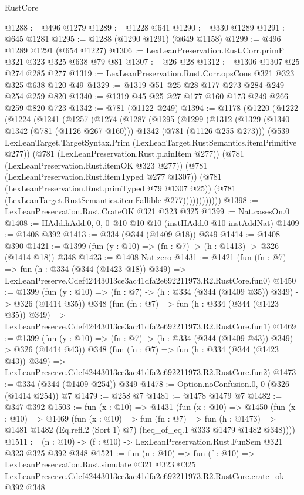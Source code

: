 \begin{lexlean}{RustCore}
\begin{coremodule}
@1288 := @496 @1279
@1289 := @1228 @641
@1290 := @330 @1289
@1291 := @645 @1281
@1295 := @1288 (@1290 @1291) (@649 @1158)
@1299 := @496 @1289 @1291 (@654 @1227)
@1306 := LexLeanPreservation.Rust.Corr.primF @321 @323 @325 @638 @79 @81
@1307 := @26 @28
@1312 := @1306 @1307 @25 @274 @285 @277
@1319 := LexLeanPreservation.Rust.Corr.opsCons @321 @323 @325 @638 @120 @49
@1329 := @1319 @51 @25 @28 @177 @273 @284 @249 @254 @259 @820
@1340 := @1319 @45 @25 @27 @177 @160 @173 @249 @266 @259 @820 @723
@1342 := @781 (@1122 @249)
@1394 := @1178
    (@1220
      (@1222
        (@1224
          (@1241
            (@1257
              (@1274
                (@1287
                  (@1295
                    (@1299
                      (@1312
                        (@1329
                          (@1340 @1342 (@781 (@1126 @267 @160)))
                          @1342
                          (@781 (@1126 @255 @273)))
                        (@539
                          LexLeanTarget.TargetSyntax.Prim
                          (LexLeanTarget.RustSemantics.itemPrimitive @277))
                        (@781 (LexLeanPreservation.Rust.plainItem @277))
                        (@781 (LexLeanPreservation.Rust.itemOK @323 @277))
                        (@781 (LexLeanPreservation.Rust.itemTyped @277 @1307))
                        (@781 (LexLeanPreservation.Rust.primTyped @79 @1307 @25))
                        (@781 (LexLeanTarget.RustSemantics.itemFallible @277))))))))))))
@1398 := LexLeanPreservation.Rust.CrateOK @321 @323 @325
@1399 := Nat.casesOn.{0}
@1408 := HAdd.hAdd.{0, 0, 0} @10 @10 @10 (instHAdd.{0} @10 instAddNat)
@1409 := @1408 @392
@1413 := @334 (@344 (@1409 @18)) @349
@1414 := @1408 @390
@1421 := @1399 (fun (y : @10) => (fn : @7) -> (h : @1413) -> @326 (@1414 @18)) @348
@1423 := @1408 Nat.zero
@1431 := @1421
    (fun (fn : @7) =>
    fun (h : @334 (@344 (@1423 @18)) @349) =>
    LexLeanPreserve.Cdef42443013ce3ac41dfa2e692211973.R2.RustCore.fun0)
@1450 := @1399
    (fun (y : @10) => (fn : @7) -> (h : @334 (@344 (@1409 @35)) @349) -> @326 (@1414 @35))
    @348
    (fun (fn : @7) =>
    fun (h : @334 (@344 (@1423 @35)) @349) =>
    LexLeanPreserve.Cdef42443013ce3ac41dfa2e692211973.R2.RustCore.fun1)
@1469 := @1399
    (fun (y : @10) => (fn : @7) -> (h : @334 (@344 (@1409 @43)) @349) -> @326 (@1414 @43))
    @348
    (fun (fn : @7) =>
    fun (h : @334 (@344 (@1423 @43)) @349) =>
    LexLeanPreserve.Cdef42443013ce3ac41dfa2e692211973.R2.RustCore.fun2)
@1473 := @334 (@344 (@1409 @254)) @349
@1478 := Option.noConfusion.{0, 0} (@326 (@1414 @254)) @7
@1479 := @258 @7
@1481 := @1478 @1479 @7
@1482 := @347 @392
@1503 := fun (x : @10) =>
  @1431
    (fun (x : @10) =>
    @1450
      (fun (x : @10) =>
      @1469
        (fun (x : @10) =>
        fun (fn : @7) =>
        fun (h : @1473) =>
        @1481 @1482 (Eq.refl.{2} (Sort 1) @7) (heq_of_eq.{1} @333 @1479 @1482 @348))))
@1511 := (n : @10) -> (f : @10) -> LexLeanPreservation.Rust.FunSem @321 @323 @325 @392 @348
@1521 := fun (n : @10) =>
  fun (f : @10) =>
  LexLeanPreservation.Rust.simulate
    @321
    @323
    @325
    LexLeanPreserve.Cdef42443013ce3ac41dfa2e692211973.R2.RustCore.crate_ok
    @392
    @348
\end{coremodule}
\end{lexlean}
